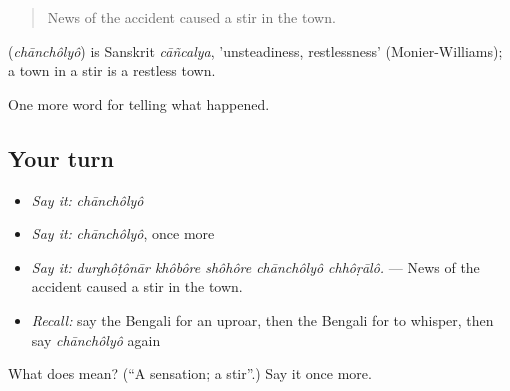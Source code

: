 \begin{quote}
News of the accident caused a stir in the town.
\end{quote}

\begin{cousinweb}
\textbf{} (\emph{chānchôlyô}) is Sanskrit \emph{cāñcalya}, 'unsteadiness, restlessness' (Monier-Williams); a town in a stir is a restless town.
\end{cousinweb}

\begin{grammarlens}[title={What you've built}]
One more word for telling what happened.
\end{grammarlens}

\subsection*{Your turn}
\begin{itemize}
\raggedright
  \item \emph{Say it:} \emph{chānchôlyô}
  \item \emph{Say it:} \emph{chānchôlyô}, once more
  \item \emph{Say it:} \emph{durghôṭônār khôbôre shôhôre chānchôlyô chhôṛālô.} — News of the accident caused a stir in the town.
  \item \emph{Recall:} say the Bengali for an uproar, then the Bengali for to whisper, then say \emph{chānchôlyô} again
\end{itemize}

\begin{tcolorbox}[breakable,colback=teal!4,colframe=teal!35!black,title={Before you move on}]
What does  mean? (\textquotedblleft{}A sensation; a stir\textquotedblright{}.) Say it once more.
\end{tcolorbox}
